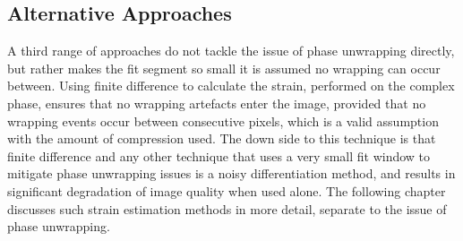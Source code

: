 \subsection{Alternative Approaches}
A third range of approaches do not tackle the issue of phase unwrapping directly, but rather makes the fit segment so small it is assumed no wrapping can occur between. Using finite difference to calculate the strain, performed on the complex phase, ensures that no wrapping artefacts enter the image, provided that no wrapping events occur between consecutive pixels, which is a valid assumption with the amount of compression used. The down side to this technique is that finite difference and any other technique that uses a very small fit window to mitigate phase unwrapping issues is a noisy differentiation method, and results in significant degradation of image quality when used alone. The following chapter discusses such strain estimation methods in more detail, separate to the issue of phase unwrapping.


